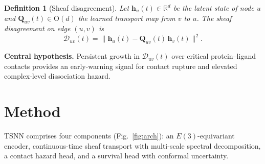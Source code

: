 \documentclass{article}
\newtheorem{definition}{Definition}
\begin{document}
\begin{definition}[Sheaf disagreement]
\label{def:disagreement}
Let $\mathbf{h}_u(t) \in \mathbb{R}^d$ be the latent state of node $u$
and $\mathbf{Q}_{uv}(t) \in \mathrm{O}(d)$ the learned transport map
from $v$ to $u$.  The \emph{sheaf disagreement} on edge $(u,v)$ is
\begin{equation}
  \mathcal{D}_{uv}(t)
  = \|\mathbf{h}_u(t) - \mathbf{Q}_{uv}(t)\,\mathbf{h}_v(t)\|^2.
  \label{eq:disagreement}
\end{equation}
\end{definition}

\textbf{Central hypothesis.}
Persistent growth in $\mathcal{D}_{uv}(t)$ over critical
protein--ligand contacts provides an early-warning signal for contact
rupture and elevated complex-level dissociation hazard.

\section{Method}
\label{sec:method}

TSNN comprises four components (Fig.~\ref{fig:arch}): an
$E(3)$-equivariant encoder, continuous-time sheaf transport with
multi-scale spectral decomposition, a contact hazard head, and a
survival head with conformal uncertainty.
\end{document}
